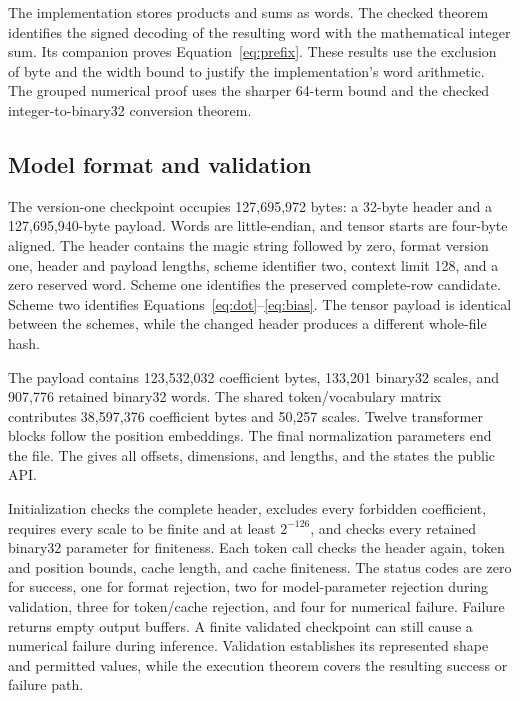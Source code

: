 The implementation stores products and sums as  words.  The checked  theorem identifies the signed decoding of the resulting word with the mathematical integer sum.  Its companion  proves Equation~\eqref{eq:prefix}.  These results use the exclusion of byte  and the width bound to justify the implementation's word arithmetic.  The grouped numerical proof uses the sharper 64-term bound and the checked integer-to-binary32 conversion theorem.

\subsection{Model format and validation}

The version-one checkpoint occupies 127,695,972 bytes: a 32-byte header and a 127,695,940-byte payload.  Words are little-endian, and tensor starts are four-byte aligned.  The header contains the magic string  followed by zero, format version one, header and payload lengths, scheme identifier two, context limit 128, and a zero reserved word.  Scheme one identifies the preserved complete-row candidate.  Scheme two identifies Equations~\eqref{eq:dot}--\eqref{eq:bias}.  The tensor payload is identical between the schemes, while the changed header produces a different whole-file hash.

The payload contains 123,532,032 coefficient bytes, 133,201 binary32 scales, and 907,776 retained binary32 words.  The shared token/vocabulary matrix contributes 38,597,376 coefficient bytes and 50,257 scales.  Twelve transformer blocks follow the position embeddings.  The final normalization parameters end the file.  The  gives all offsets, dimensions, and lengths, and the  states the public API.

Initialization checks the complete header, excludes every forbidden coefficient, requires every scale to be finite and at least $2^{-126}$, and checks every retained binary32 parameter for finiteness.  Each token call checks the header again, token and position bounds, cache length, and cache finiteness.  The status codes are zero for success, one for format rejection, two for model-parameter rejection during validation, three for token/cache rejection, and four for numerical failure.  Failure returns empty output buffers.  A finite validated checkpoint can still cause a numerical failure during inference.  Validation establishes its represented shape and permitted values, while the execution theorem covers the resulting success or failure path.
